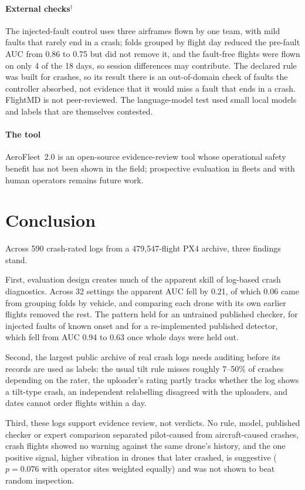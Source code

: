 \documentclass[preprint,12pt]{elsarticle}
\begin{document}
\paragraph{External checks$^\dagger$} The injected-fault control uses three airframes flown by one team, with mild faults that rarely end in a crash; folds grouped by flight day reduced the pre-fault AUC from 0.86 to 0.75 but did not remove it, and the fault-free flights were flown on only 4 of the 18 days, so session differences may contribute. The declared rule was built for crashes, so its result there is an out-of-domain check of faults the controller absorbed, not evidence that it would miss a fault that ends in a crash. FlightMD is not peer-reviewed. The language-model test used small local models and labels that are themselves contested.

\paragraph{The tool} AeroFleet~2.0 is an open-source evidence-review tool whose operational safety benefit has not been shown in the field; prospective evaluation in fleets and with human operators remains future work.

\section{Conclusion}
\label{sec:conclusion}
Across 590 crash-rated logs from a 479,547-flight PX4 archive, three findings stand.

First, evaluation design creates much of the apparent skill of log-based crash diagnostics. Across 32 settings the apparent AUC fell by 0.21, of which 0.06 came from grouping folds by vehicle, and comparing each drone with its own earlier flights removed the rest. The pattern held for an untrained published checker, for injected faults of known onset and for a re-implemented published detector, which fell from AUC 0.94 to 0.63 once whole days were held out.

Second, the largest public archive of real crash logs needs auditing before its records are used as labels: the usual tilt rule misses roughly 7--50\% of crashes depending on the rater, the uploader's rating partly tracks whether the log shows a tilt-type crash, an independent relabelling disagreed with the uploaders, and dates cannot order flights within a day.

Third, these logs support evidence review, not verdicts. No rule, model, published checker or expert comparison separated pilot-caused from aircraft-caused crashes, crash flights showed no warning against the same drone's history, and the one positive signal, higher vibration in drones that later crashed, is suggestive ($p=0.076$ with operator sites weighted equally) and was not shown to beat random inspection.
\end{document}
